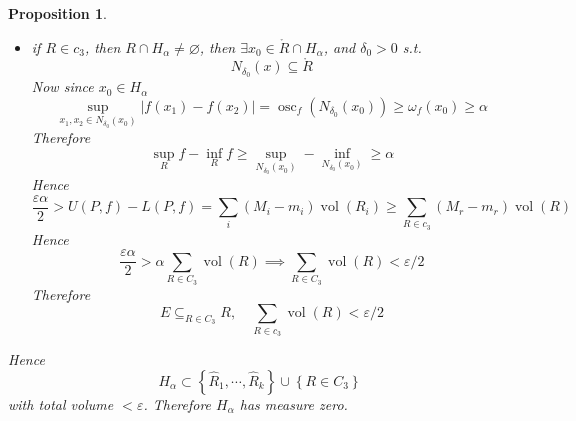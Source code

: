 \documentclass[11pt,a4paper]{article}
\theoremstyle{definition}
\theoremstyle{plain}
\newtheorem{proposition}[definition]{Proposition}
\theoremstyle{remark}
\renewcommand{\set}[1]{\left\{ #1 \right\}}
\newcommand{\abs}[1]{\lvert #1 \rvert}
\newcommand{\vol}{\operatorname{vol}}
\begin{document}
\begin{proposition}
\begin{itemize}
\begin{itemize}
            \item if $R \in c_3$, then $R \cap H_\alpha \ne \varnothing$, then $\exists x_0 \in \mathring{R }\cap H_\alpha$, and $\delta_0 > 0$ s.t. 
            $$N_{\delta_0}(x) \subseteq \mathring{R}$$
            Now since $x_0 \in H_\alpha$ 
            $$\sup_{x_1, x_2 \in N_{\delta_0}(x_0)} \abs{f(x_1) - f(x_2)} = \operatorname{osc}_f (N_{\delta_0} (x_0)) \ge \omega_f (x_0) \ge \alpha$$
            Therefore 
            $$\sup_R f - \inf_R f \ge \sup_{N_{\delta_0} (x_0)} - \inf_{N_{\delta_0} (x_0)} \ge \alpha$$
            Hence 
            $$\frac{\varepsilon \alpha}{2} > U(P,f) - L(P,f) = \sum_i (M_i - m_i) \vol (R_i) \ge \sum_{R \in c_3} (M_r - m_r) \vol( R)$$
            Hence 
            $$\frac{\varepsilon \alpha}{2} > \alpha \sum_{R \in C_3} \vol (R) \implies \sum_{R \in C_3} \vol (R) < \varepsilon/2$$
            Therefore 
            $$E \subseteq_{R \in C_3} R, \quad \sum_{R \in c_3} \vol (R) < \varepsilon/2$$
        \end{itemize}
        Hence 
        $$H_\alpha \subset \set{\hat{R}_1, \cdots, \hat{R}_k} \cup \set{R \in C_3}$$
        with total volume $< \varepsilon$. Therefore $H_\alpha$ has measure zero. 
        

\end{itemize}
\end{proposition}
\end{document}
